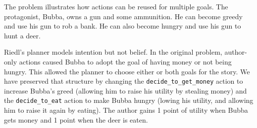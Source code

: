 \documentclass{nilreport}
\begin{document}
\noindent The problem illustrates how actions can be reused for multiple
goals. The protagonist, Bubba, owns a gun and some ammunition. He
can become greedy and use his gun to rob a bank. He can also become
hungry and use his gun to hunt a deer.

Riedl's planner models intention but not belief. In the original problem,
author-only actions caused Bubba to adopt the goal of having money
or not being hungry. This allowed the planner to choose either or
both goals for the story. We have preserved that structure by changing
the \texttt{decide\_to\_get\_money} action to increase Bubba's greed
(allowing him to raise his utility by stealing money) and the \texttt{decide\_to\_eat}
action to make Bubba hungry (lowing his utility, and allowing him
to raise it again by eating). The author gains 1 point of utility
when Bubba gets money and 1 point when the deer is eaten.

\medskip{}
\noindent{}

\medskip{}
\noindent{}
\end{document}
